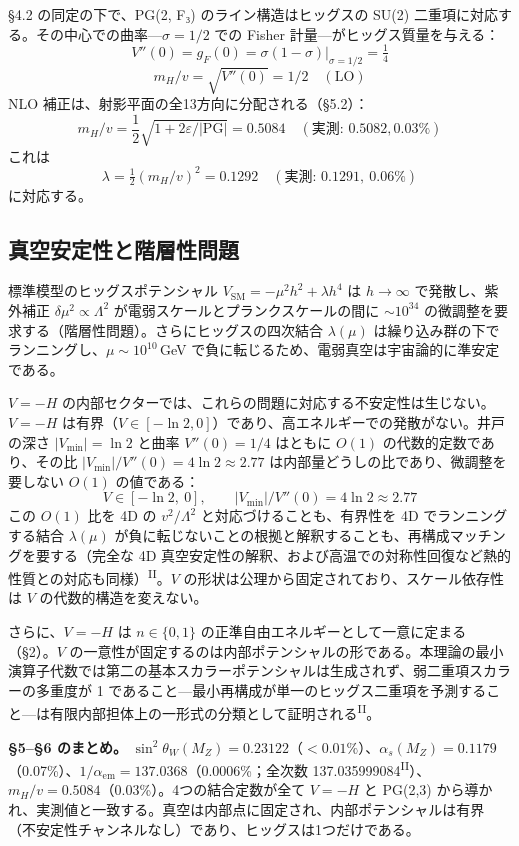 \documentclass[fontsize=11pt,paper=a4,lualatex]{jlreq}
\newcommand{\PII}{\textsuperscript{\textup{II}}}
\begin{document}
§4.2 の同定の下で、PG(2, F₃) のライン構造はヒッグスの SU(2) 二重項に対応する。その中心での曲率---$\sigma = 1/2$ での Fisher 計量---がヒッグス質量を与える：
\[V''(0) = g_F(0) = \sigma(1-\sigma)\big|_{\sigma=1/2} = \tfrac{1}{4}\]
\[m_H/v = \sqrt{V''(0)} = 1/2 \quad (\mathrm{LO})\]
NLO 補正は、射影平面の全13方向に分配される（§5.2）：
\[m_H/v = \frac{1}{2}\sqrt{1 + 2\varepsilon/|\mathrm{PG}|} = 0.5084 \quad (\text{実測: } 0.5082, 0.03\%)\]
これは
\[\lambda = \tfrac{1}{2}(m_H/v)^2 = 0.1292\quad(\text{実測: } 0.1291,\ 0.06\%)\]
に対応する。

\subsection{真空安定性と階層性問題}

標準模型のヒッグスポテンシャル $V_\mathrm{SM} = -\mu^2 h^2 + \lambda h^4$ は $h \to \infty$ で発散し、紫外補正 $\delta\mu^2 \propto \Lambda^2$ が電弱スケールとプランクスケールの間に $\sim 10^{34}$ の微調整を要求する（階層性問題）。さらにヒッグスの四次結合 $\lambda(\mu)$ は繰り込み群の下でランニングし、$\mu \sim 10^{10}$\,GeV で負に転じるため、電弱真空は宇宙論的に準安定である。

$V = -H$ の内部セクターでは、これらの問題に対応する不安定性は生じない。$V = -H$ は有界（$V \in [-\ln 2, 0]$）であり、高エネルギーでの発散がない。井戸の深さ $|V_{\min}| = \ln 2$ と曲率 $V''(0) = 1/4$ はともに $O(1)$ の代数的定数であり、その比 $|V_{\min}|/V''(0) = 4\ln 2 \approx 2.77$ は内部量どうしの比であり、微調整を要しない $O(1)$ の値である：
\[V \in [-\ln 2,\ 0],\qquad |V_{\min}|/V''(0) = 4\ln 2 \approx 2.77\]
この $O(1)$ 比を 4D の $v^2/\Lambda^2$ と対応づけることも、有界性を 4D でランニングする結合 $\lambda(\mu)$ が負に転じないことの根拠と解釈することも、再構成マッチングを要する（完全な 4D 真空安定性の解釈、および高温での対称性回復など熱的性質との対応も同様）\PII{}。$V$ の形状は公理から固定されており、スケール依存性は $V$ の代数的構造を変えない。

さらに、$V = -H$ は $n \in \{0,1\}$ の正準自由エネルギーとして一意に定まる（§2）。$V$ の一意性が固定するのは内部ポテンシャルの形である。本理論の最小演算子代数では第二の基本スカラーポテンシャルは生成されず、弱二重項スカラーの多重度が 1 であること---最小再構成が単一のヒッグス二重項を予測すること---は有限内部担体上の一形式の分類として証明される\PII{}。

\noindent\textbf{§5--§6 のまとめ。} $\sin^2\!\theta_W(M_Z) = 0.23122$（$<0.01\%$）、$\alpha_s(M_Z) = 0.1179$（0.07\%）、$1/\alpha_\mathrm{em} = 137.0368$（0.0006\%；全次数 137.035999084\PII{}）、$m_H/v = 0.5084$（0.03\%）。4つの結合定数が全て $V = -H$ と PG(2,3) から導かれ、実測値と一致する。真空は内部点に固定され、内部ポテンシャルは有界（不安定性チャンネルなし）であり、ヒッグスは1つだけである。
\end{document}
